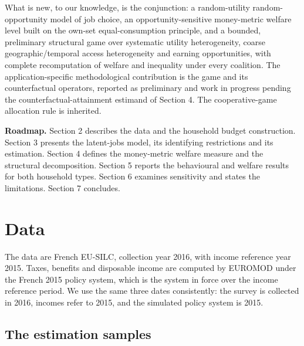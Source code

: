 \documentclass[11pt,a4paper]{article}
\begin{document}
What is new, to our knowledge, is the conjunction: a random-utility random-opportunity model of job choice, an opportunity-sensitive money-metric welfare level built on the own-set equal-consumption principle, and a bounded, preliminary structural game over systematic utility heterogeneity, coarse geographic/temporal access heterogeneity and earning opportunities, with complete recomputation of welfare and inequality under every coalition. The application-specific methodological contribution is the game and its counterfactual operators, reported as preliminary and work in progress pending the counterfactual-attainment estimand of Section 4. The cooperative-game allocation rule is inherited.

\textbf{Roadmap.} Section 2 describes the data and the household budget construction. Section 3 presents the latent-jobs model, its identifying restrictions and its estimation. Section 4 defines the money-metric welfare measure and the structural decomposition. Section 5 reports the behavioural and welfare results for both household types. Section 6 examines sensitivity and states the limitations. Section 7 concludes.

\section{Data}\label{data}

The data are French EU-SILC, collection year 2016, with income reference year 2015. Taxes, benefits and disposable income are computed by EUROMOD \citep{sutherlandfigari2013} under the French 2015 policy system, which is the system in force over the income reference period. We use the same three dates consistently: the survey is collected in 2016, incomes refer to 2015, and the simulated policy system is 2015.

\subsection{The estimation samples}\label{the-estimation-samples}
\end{document}
